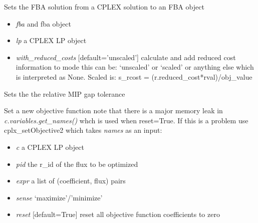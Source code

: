 \documentclass[a4paper,11pt,english]{sphinxmanual}
\begin{document}

\begin{fulllineitems}
\label{modules_doc:cbmpy.CBCPLEX.cplx_setFBAsolutionToModel}
Sets the FBA solution from a CPLEX solution to an FBA object
\begin{itemize}
\item {} 
\emph{fba} and fba object

\item {} 
\emph{lp} a CPLEX LP object

\item {} 
\emph{with\_reduced\_costs} {[}default='unscaled'{]} calculate and add reduced cost information to mode this can be: `unscaled' or `scaled'
or anything else which is interpreted as None. Scaled is: s\_rcost = (r.reduced\_cost*rval)/obj\_value

\end{itemize}

\end{fulllineitems}


\begin{fulllineitems}
\label{modules_doc:cbmpy.CBCPLEX.cplx_setMIPGapTolerance}
Sets the the relative MIP gap tolerance

\end{fulllineitems}


\begin{fulllineitems}
\label{modules_doc:cbmpy.CBCPLEX.cplx_setObjective}
Set a new objective function note that there is a major memory leak in
\emph{c.variables.get\_names()} whch is used when reset=True. If this is a problem
use cplx\_setObjective2 which takes \emph{names} as an input:
\begin{itemize}
\item {} 
\emph{c} a CPLEX LP object

\item {} 
\emph{pid} the r\_id of the flux to be optimized

\item {} 
\emph{expr} a list of (coefficient, flux) pairs

\item {} 
\emph{sense} `maximize'/'minimize'

\item {} 
\emph{reset} {[}default=True{]} reset all objective function coefficients to zero

\end{itemize}

\end{fulllineitems}
\end{document}
